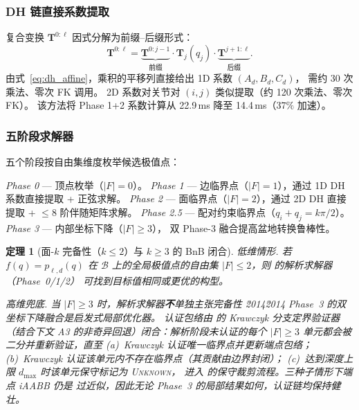 \documentclass[journal]{IEEEtran}
\newtheorem{theorem}{定理}
\newcommand{\bT}{\mathbf{T}}
\begin{document}
\subsubsection{DH 链直接系数提取}

复合变换 $\bT^{0:\ell}$ 因式分解为前缀--后缀形式：
\begin{equation}\label{eq:prefix_suffix}
  \bT^{0:\ell} = \underbrace{\bT^{0:j-1}}_\text{前缀}
  \cdot \bT_j(q_j) \cdot \underbrace{\bT^{j+1:\ell}}_\text{后缀}.
\end{equation}
由式~\eqref{eq:dh_affine}，乘积的平移列直接给出 1D 系数 $(A_d, B_d, C_d)$，
需约 30 次乘法、零次 FK 调用。
2D 系数对关节对 $(i,j)$ 类似提取（约 120 次乘法、零次 FK）。
该方法将 Phase 1+2 系数计算从 22.9\,ms 降至 14.4\,ms（$37\%$ 加速）。

\subsubsection{五阶段求解器}

五个阶段按自由集维度枚举候选极值点：

\emph{Phase 0} --- 顶点枚举（$|F|=0$）。
\emph{Phase 1} --- 边临界点（$|F|=1$），通过 1D DH 系数直接提取 + 正弦求解。
\emph{Phase 2} --- 面临界点（$|F|=2$），通过 2D DH 直接提取 + $\leq 8$ 阶伴随矩阵求解。
\emph{Phase 2.5} --- 配对约束临界点（$q_i + q_j = k\pi/2$）。
\emph{Phase 3} --- 内部坐标下降（$|F|\geq 3$），
双 Phase-3 融合提高盆地转换鲁棒性。

\begin{theorem}[面-$k$ 完备性（$k\leq 2$）与 $k\geq 3$ 的 BnB 闭合]\label{thm:face}
\emph{低维情形.} 若 $f(q)=p_{\ell,d}(q)$ 在 $\mathcal{B}$ 上的全局极值点的自由集
$|F|\leq 2$，则  的解析求解器（Phase~0/1/2）
可找到目标值相同或更优的构型。

\emph{高维兜底.} 当 $|F|\geq 3$ 时，解析求解器\textbf{不}单独主张完备性
\u2014\u2014 Phase~3 的双坐标下降融合是启发式局部优化器。
认证包络由  的 Krawczyk 分支定界验证器（结合下文 A3
的非奇异回退）闭合：解析阶段未认证的每个 $|F|\geq 3$ 单元都会被
二分并重新验证，直至 (a)~Krawczyk 认证唯一临界点并更新端点包络；
(b)~Krawczyk 认证该单元内不存在临界点（其贡献由边界封闭）；
(c)~达到深度上限 $d_{\max}$ 时该单元保守标记为 \textsc{Unknown}，
进入  的保守裁剪流程。三种子情形下端点 iAABB 仍是
过近似，因此无论 Phase~3 的局部结果如何，认证链均保持健壮。
\end{theorem}
\end{document}
